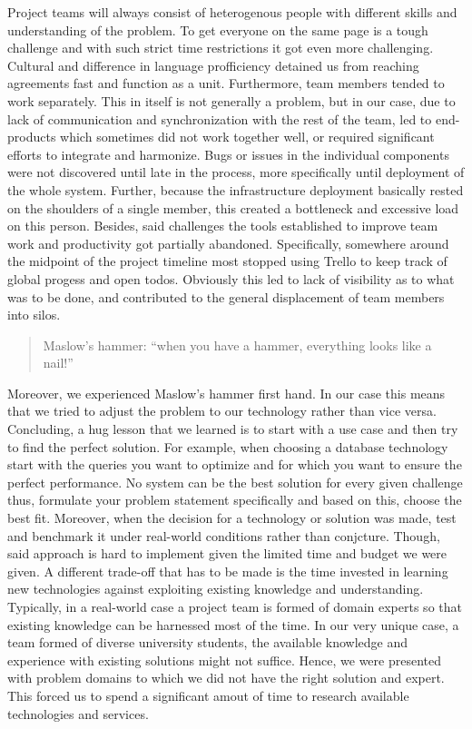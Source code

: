 Project teams will always consist of heterogenous people with different skills and understanding of the problem. To get everyone on the same page is a tough challenge and with such strict time restrictions it got even more challenging. Cultural and difference in language profficiency detained us from reaching agreements fast and function as a unit. Furthermore, team members tended to work separately. This in itself is not generally a problem, but in our case, due to lack of communication and synchronization with the rest of the team, led to end-products which sometimes did not work together well, or required significant efforts to integrate and harmonize. Bugs or issues in the individual components were not discovered until late in the process, more specifically until deployment of the whole system. Further, because the infrastructure deployment basically rested on the shoulders of a single member, this created a bottleneck and excessive load on this person. Besides, said challenges the tools established to improve team work and productivity got partially abandoned. Specifically, somewhere around the midpoint of the project timeline most stopped using Trello to keep track of global progess and open todos. Obviously this led to lack of visibility as to what was to be done, and contributed to the general displacement of team members into silos.

\begin{quotation}
Maslow's hammer: "`when you have a hammer, everything looks like a nail!"'
\end{quotation}

Moreover, we experienced Maslow's hammer first hand. In our case this means that we tried to adjust the problem to our technology rather than vice versa. Concluding, a hug lesson that we learned is to start with a use case and then try to find the perfect solution. For example, when choosing a database technology start with the queries you want to optimize and for which you want to ensure the perfect performance. No system can be the best solution for every given challenge thus, formulate your problem statement specifically and based on this, choose the best fit. Moreover, when the decision for a technology or solution was made, test and benchmark it under real-world conditions rather than conjcture. Though, said approach is hard to implement given the limited time and budget we were given. A different trade-off that has to be made is the time invested in learning new technologies against exploiting existing knowledge and understanding. Typically, in a real-world case a project team is formed of domain experts so that existing knowledge can be harnessed most of the time. In our very unique case, a team formed of diverse university students, the available knowledge and experience with existing solutions might not suffice. Hence, we were presented with problem domains to which we did not have the right solution and expert. This forced us to spend a significant amout of time to research available technologies and services.

